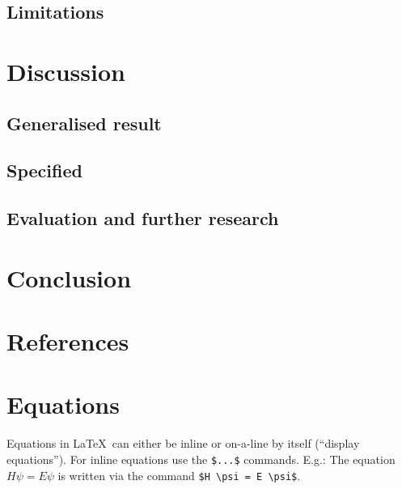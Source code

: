 \documentclass{article}
\begin{document}
\subsection{Limitations}\label{subsec3}

\section{Discussion}\label{sec4}
\subsection{Generalised result}\label{subsec1}

\subsection{Specified }\label{subsec2}

\subsection{Evaluation and further research}\label{subsec3}

\section{Conclusion}\label{sec5}



\section{References}\label{sec6}



\section{Equations}\label{sec4}

Equations in \LaTeX\ can either be inline or on-a-line by itself (``display equations''). For
inline equations use the \verb+$...$+ commands. E.g.: The equation
$H\psi = E \psi$ is written via the command \verb+$H \psi = E \psi$+.
\end{document}
